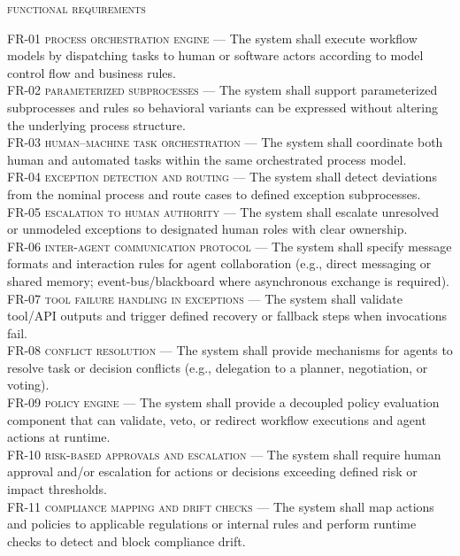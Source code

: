\noindent \textsc{functional requirements} \\
\begin{footnotesize}
\noindent \textsc{FR-01 process orchestration engine} --- The system shall execute workflow models by dispatching tasks to human or software actors according to model control flow and business rules. \\
\noindent \textsc{FR-02 parameterized subprocesses} --- The system shall support parameterized subprocesses and rules so behavioral variants can be expressed without altering the underlying process structure. \\
\noindent \textsc{FR-03 human–machine task orchestration} --- The system shall coordinate both human and automated tasks within the same orchestrated process model. \\
\noindent \textsc{FR-04 exception detection and routing} --- The system shall detect deviations from the nominal process and route cases to defined exception subprocesses. \\
\noindent \textsc{FR-05 escalation to human authority} --- The system shall escalate unresolved or unmodeled exceptions to designated human roles with clear ownership. \\
\noindent \textsc{FR-06 inter-agent communication protocol} --- The system shall specify message formats and interaction rules for agent collaboration (e.g., direct messaging or shared memory; event-bus/blackboard where asynchronous exchange is required).\\
\noindent \textsc{FR-07 tool failure handling in exceptions} --- The system shall validate tool/API outputs and trigger defined recovery or fallback steps when invocations fail.\\
\noindent \textsc{FR-08 conflict resolution} --- The system shall provide mechanisms for agents to resolve task or decision conflicts (e.g., delegation to a planner, negotiation, or voting).\\
\noindent \textsc{FR-09 policy engine} --- The system shall provide a decoupled policy evaluation component that can validate, veto, or redirect workflow executions and agent actions at runtime. \\
\noindent \textsc{FR-10 risk-based approvals and escalation} --- The system shall require human approval and/or escalation for actions or decisions exceeding defined risk or impact thresholds. \\
\noindent \textsc{FR-11 compliance mapping and drift checks} --- The system shall map actions and policies to applicable regulations or internal rules and perform runtime checks to detect and block compliance drift. \\

\end{footnotesize}
